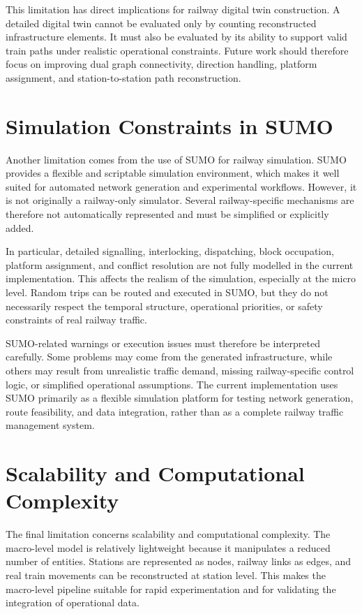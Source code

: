 This limitation has direct implications for railway digital twin construction. A detailed digital twin cannot be evaluated 
only by counting reconstructed infrastructure elements. It must also be evaluated by its ability to support valid train 
paths under realistic operational constraints. Future work should therefore focus on improving dual graph connectivity, 
direction handling, platform assignment, and station-to-station path reconstruction.

\section{Simulation Constraints in SUMO}
Another limitation comes from the use of SUMO for railway simulation. SUMO provides a flexible and scriptable simulation 
environment, which makes it well suited for automated network generation and experimental workflows. However, it is not 
originally a railway-only simulator. Several railway-specific mechanisms are therefore not automatically represented and 
must be simplified or explicitly added.

In particular, detailed signalling, interlocking, dispatching, block occupation, platform assignment, and conflict 
resolution are not fully modelled in the current implementation. This affects the realism of the simulation, especially at 
the micro level. Random trips can be routed and executed in SUMO, but they do not necessarily respect the temporal 
structure, operational priorities, or safety constraints of real railway traffic.

\newpage

SUMO-related warnings or execution issues must therefore be interpreted carefully. Some problems may come from the generated infrastructure, 
while others may result from unrealistic traffic demand, missing railway-specific control logic, or simplified operational 
assumptions. The current implementation uses SUMO primarily as a flexible simulation platform for testing network 
generation, route feasibility, and data integration, rather than as a complete railway traffic management system.

\section{Scalability and Computational Complexity}
The final limitation concerns scalability and computational complexity. The macro-level model is relatively lightweight 
because it manipulates a reduced number of entities. Stations are represented as nodes, railway links as edges, and real 
train movements can be reconstructed at station level. This makes the macro-level pipeline suitable for rapid 
experimentation and for validating the integration of operational data.

